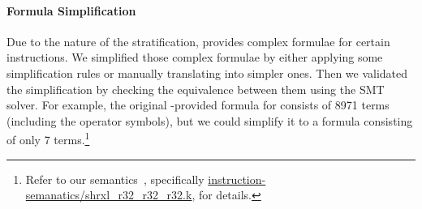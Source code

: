 


 
\paragraph{Formula Simplification}

Due to the nature of the stratification, \Strata provides complex formulae for certain instructions.
%
We simplified those complex formulae by either applying some simplification rules or manually translating into simpler ones.
Then we validated the simplification by checking the equivalence between them using the SMT solver.
%
For example, the original \Strata-provided formula for  consists of 8971 terms (including the operator symbols), but we could simplify it to a formula consisting of only 7 terms.\footnote{Refer to our semantics~\cite{Suppl}, specifically \url{instruction-semanatics/shrxl_r32_r32_r32.k}, for details.}









